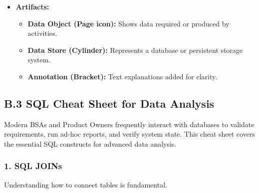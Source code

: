 \begin{itemize}
  \begin{itemize}
  \tightlist
  \item
    \textbf{Pool:} Represents a major participant (e.g., an organization
    or a distinct system).
  \item
    \textbf{Lane:} Sub-partitions within a pool representing specific
    roles or departments (e.g., ``Sales,'' ``Finance'').
  \end{itemize}
\item
  \textbf{Artifacts:}

  \begin{itemize}
  \tightlist
  \item
    \textbf{Data Object (Page icon):} Shows data required or produced by
    activities.
  \item
    \textbf{Data Store (Cylinder):} Represents a database or persistent
    storage system.
  \item
    \textbf{Annotation (Bracket):} Text explanations added for clarity.
  \end{itemize}
\end{itemize}

\bigskip

\subsection{B.3 SQL Cheat Sheet for Data
Analysis}\label{b.3-sql-cheat-sheet-for-data-analysis}

Modern BSAs and Product Owners frequently interact with databases to
validate requirements, run ad-hoc reports, and verify system state. This
cheat sheet covers the essential SQL constructs for advanced data
analysis.

\subsubsection{1. SQL JOINs}\label{sql-joins}

Understanding how to connect tables is fundamental.

